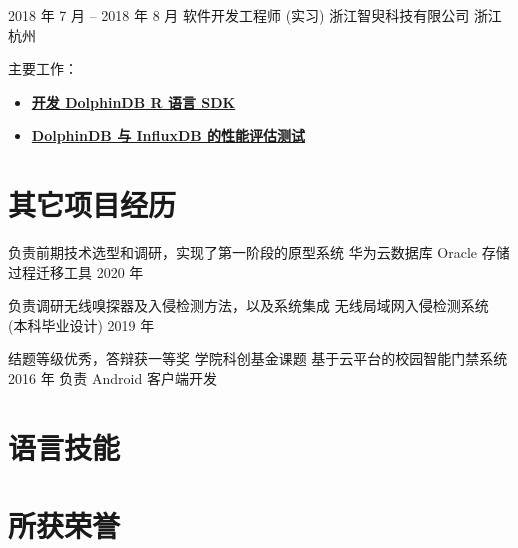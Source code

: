 \documentclass[11pt,a4paper,sans]{moderncv}   %
\begin{document}
\begin{CJK}{UTF8}{gbsn}
\cventry
{2018 年 7 月 -- 2018 年 8 月}
{软件开发工程师 (实习)}
{浙江智臾科技有限公司}
{浙江杭州}
{}{主要工作：
\begin{itemize}%
  \item \textbf{
    \href{https://github.com/dolphindb/api-r}{开发 DolphinDB R 语言 SDK}
  }
  \item \textbf{
    \href{https://zhuanlan.zhihu.com/p/42287416}{DolphinDB 与 InfluxDB 的性能评估测试}
  } \newline{}
\end{itemize}}


\section{其它项目经历}

\cventry{}
{负责前期技术选型和调研，实现了第一阶段的原型系统}
{华为云数据库 Oracle 存储过程迁移工具}
{2020 年}{}{}

\cventry{}
{负责调研无线嗅探器及入侵检测方法，以及系统集成}
{无线局域网入侵检测系统 (本科毕业设计)}
{2019 年}{}{
}

\cventry
{结题等级优秀，答辩获一等奖}
{学院科创基金课题}
{基于云平台的校园智能门禁系统}
{2016 年}
{负责 Android 客户端开发}{}

\section{语言技能}

\section{所获荣誉}


\end{CJK}
\end{document}
